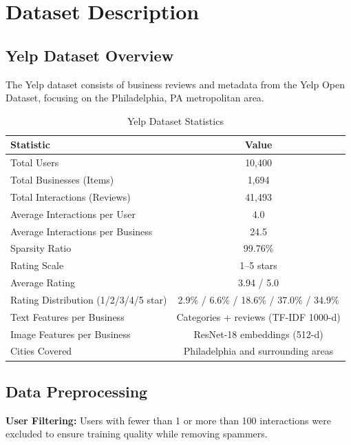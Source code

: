 \documentclass[12pt,a4paper]{report}
\begin{document}
{%
\chapter{Dataset Description}
\label{appendix:dataset}

\section{Yelp Dataset Overview}

The Yelp dataset consists of business reviews and metadata from the Yelp Open Dataset, focusing on the Philadelphia, PA metropolitan area.

\begin{table}[htbp]
\centering
\small
\caption{Yelp Dataset Statistics}
\label{tab:dataset_stats}
\begin{tabular}{lc}
\toprule
\textbf{Statistic} & \textbf{Value} \\
\midrule
Total Users                    & 10,400 \\
Total Businesses (Items)       & 1,694 \\
Total Interactions (Reviews)   & 41,493 \\
Average Interactions per User  & 4.0 \\
Average Interactions per Business & 24.5 \\
Sparsity Ratio                 & 99.76\% \\
Rating Scale                   & 1--5 stars \\
Average Rating                 & 3.94 / 5.0 \\
Rating Distribution (1/2/3/4/5 star) & 2.9\% / 6.6\% / 18.6\% / 37.0\% / 34.9\% \\
Text Features per Business     & Categories + reviews (TF-IDF 1000-d) \\
Image Features per Business    & ResNet-18 embeddings (512-d) \\
Cities Covered                 & Philadelphia and surrounding areas \\
\bottomrule
\end{tabular}
\end{table}

\section{Data Preprocessing}

\textbf{User Filtering:} Users with fewer than 1 or more than 100 interactions were excluded to ensure training quality while removing spammers.

}
\end{document}
